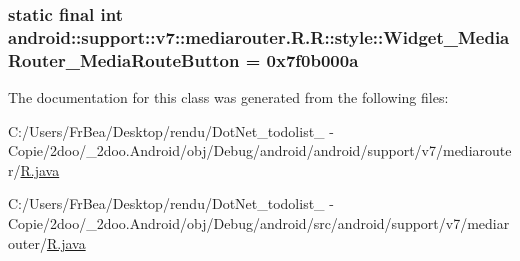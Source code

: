\hypertarget{classandroid_1_1support_1_1v7_1_1mediarouter_1_1_r_1_1style_3659944f3d59c6c75f7743a1899617b3}{
\subsubsection[{Widget\_\-MediaRouter\_\-MediaRouteButton}]{\setlength{\rightskip}{0pt plus 5cm}static final int android::support::v7::mediarouter.R.R::style::Widget\_\-MediaRouter\_\-MediaRouteButton = 0x7f0b000a}}
\label{classandroid_1_1support_1_1v7_1_1mediarouter_1_1_r_1_1style_3659944f3d59c6c75f7743a1899617b3}




The documentation for this class was generated from the following files:\begin{CompactItemize}
\item 
C:/Users/FrBea/Desktop/rendu/DotNet\_\-todolist\_ - Copie/2doo/\_\-2doo.Android/obj/Debug/android/android/support/v7/mediarouter/\hyperlink{android_2support_2v7_2mediarouter_2_r_8java}{R.java}\item 
C:/Users/FrBea/Desktop/rendu/DotNet\_\-todolist\_ - Copie/2doo/\_\-2doo.Android/obj/Debug/android/src/android/support/v7/mediarouter/\hyperlink{src_2android_2support_2v7_2mediarouter_2_r_8java}{R.java}\end{CompactItemize}
